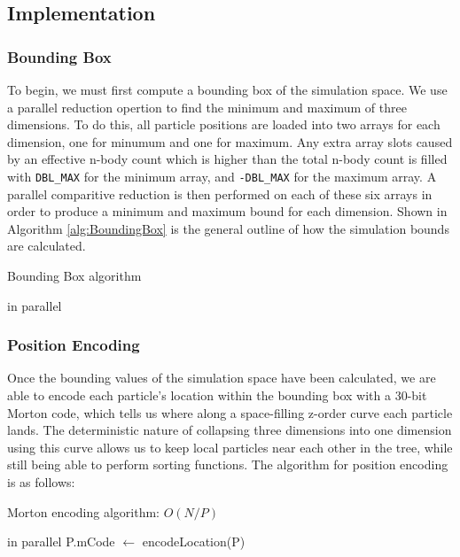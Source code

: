 \documentclass{thesis}
\begin{document}
\subsection{Implementation}
\subsubsection{Bounding Box}
To begin, we must first compute a bounding box of the simulation space. We use a parallel reduction opertion to find the minimum and maximum of three dimensions. To do this, all particle positions are loaded into two arrays for each dimension, one for minumum and one for maximum. Any extra array slots caused by an effective n-body count which is higher than the total n-body count is filled with \verb|DBL_MAX| for the minimum array, and \verb|-DBL_MAX| for the maximum array. A parallel comparitive reduction is then performed on each of these six arrays in order to produce a minimum and maximum bound for each dimension. Shown in Algorithm \ref{alg:BoundingBox} is the general outline of how the simulation bounds are calculated. 
\begin{algorithm}
    \label{alg:BoundingBox}
    \caption{Bounding Box algorithm}
    \begin{algorithmic}
             in parallel

            \EndFor
        \EndFor
    \end{algorithmic}
\end{algorithm}
\subsubsection{Position Encoding}
Once the bounding values of the simulation space have been calculated, we are able to encode each particle's location within the bounding box with a 30-bit  Morton code, which tells us where along a space-filling z-order curve each particle lands. The deterministic nature of collapsing three dimensions into one dimension using this curve allows us to keep local particles near each other in the tree, while still being able to perform sorting functions. The algorithm for position encoding is as follows:
\begin{algorithm}
    \label{alg:PositionEncoding}
    \caption{Morton encoding algorithm: $O(N/P)$}
    \begin{algorithmic}
         in parallel    
            \State P.mCode $\gets$ encodeLocation(P)
        \EndFor
    \end{algorithmic}
\end{algorithm}
\end{document}
